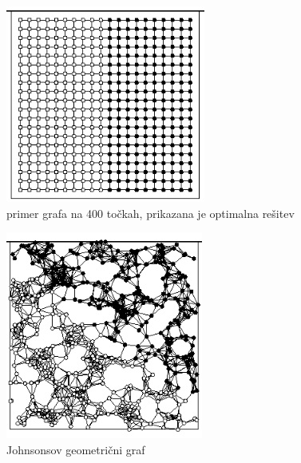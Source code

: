 \documentclass[12pt,a4paper]{amsart}
\theoremstyle{definition} %
\theoremstyle{plain} %
\begin{document}
\begin{figure}[h]
    \centering
    \includegraphics{drugi_graf} 
    \caption{primer grafa na 400 točkah, prikazana je optimalna rešitev}
    \label{fig:2_graf}
\end{figure}

\begin{figure}[h]
    \centering
    \includegraphics{tretji_graf} 
    \caption{Johnsonsov geometrični graf}
    \label{fig:3_graf}
\end{figure}
\end{document}
